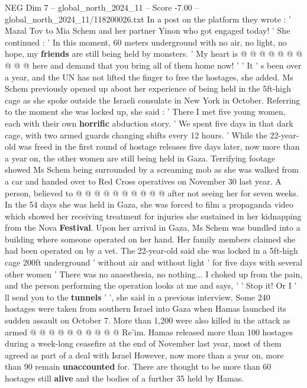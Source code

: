 \begin{textsample}{NEG Dim 7 – global\_north\_2024\_11 – Score -7.00 – global\_north\_2024\_11/118200026.txt}
In a post on the platform they wrote : ' Mazal Tov to Mia Schem and her partner Yinon who got engaged today! ' She continued : ' In this moment, 60 meters underground with no air, no light, no hope, my \textbf{friends} are still being held by monsters. ' My heart is @ @ @ @ @ @ @ @ @ @ here and demand that you bring all of them home now! ' ' It ' s been over a year, and the UN has not lifted the finger to free the hostages, she added.
Ms Schem previously opened up about her experience of being held in the 5ft-high cage as she spoke outside the Israeli consulate in New York in October.
Referring to the moment she was locked up, she said : ' There I met five young women, each with their own \textbf{horrific} abduction story. ' We spent five days in that dark cage, with two armed guards changing shifts every 12 hours. ' While the 22-year-old was freed in the first round of hostage releases five days later, now more than a year on, the other women are still being held in Gaza.
Terrifying footage showed Ms Schem being surrounded by a screaming mob as she was walked from a car and handed over to Red Cross operatives on November 30 last year.
A person, believed to @ @ @ @ @ @ @ @ @ @ after not seeing her for seven weeks.
In the 54 days she was held in Gaza, she was forced to film a propaganda video which showed her receiving treatment for injuries she sustained in her kidnapping from the Nova \textbf{Festival}.
Upon her arrival in Gaza, Ms Schem was bundled into a building where someone operated on her hand.
Her family members claimed she had been operated on by a vet.
The 22-year-old said she was locked in a 5ft-high cage 200ft underground ' without air and without light ' for five days with several other women ' There was no anaesthesia, no nothing...
I choked up from the pain, and the person performing the operation looks at me and says, ' ' Stop it!
Or I ' ll send you to the \textbf{tunnels} ' ', she said in a previous interview.
Some 240 hostages were taken from southern Israel into Gaza when Hamas launched its sudden assault on October 7.
More than 1,200 were also killed in the attack as armed @ @ @ @ @ @ @ @ @ @ Re'im.
Hamas released more than 100 hostages during a week-long ceasefire at the end of November last year, most of them agreed as part of a deal with Israel However, now more than a year on, more than 90 remain \textbf{unaccounted} for.
There are thought to be more than 60 hostages still \textbf{alive} and the bodies of a further 35 held by Hamas.

\end{textsample}
